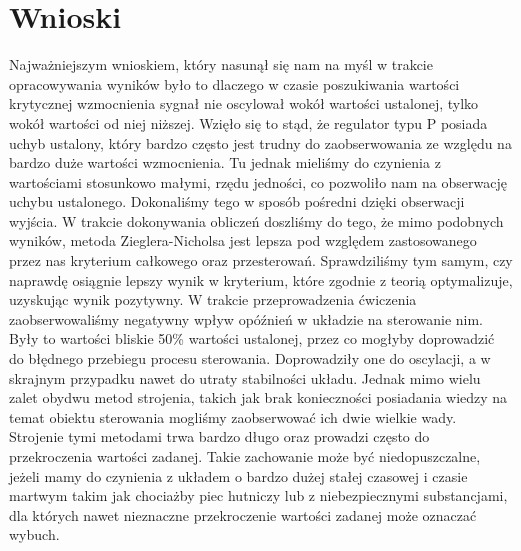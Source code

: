 \documentclass[a4paper, 12pt]{article}
\begin{document}
		\section{Wnioski}
			Najważniejszym wnioskiem, który nasunął się nam na myśl w trakcie opracowywania wyników było to dlaczego w czasie poszukiwania wartości krytycznej wzmocnienia sygnał nie oscylował wokół wartości ustalonej, tylko wokół wartości od niej niższej. Wzięło się to stąd, że regulator typu P posiada uchyb ustalony, który bardzo często jest trudny do zaobserwowania ze względu na bardzo duże wartości wzmocnienia. Tu jednak mieliśmy do czynienia z wartościami stosunkowo małymi, rzędu jedności, co pozwoliło nam na obserwację uchybu ustalonego. Dokonaliśmy tego w sposób pośredni dzięki obserwacji wyjścia.
			\newline
			\newline
			W trakcie dokonywania obliczeń doszliśmy do tego, że mimo podobnych wyników, metoda Zieglera-Nicholsa jest lepsza pod względem zastosowanego przez nas kryterium całkowego oraz przesterowań. Sprawdziliśmy tym samym, czy naprawdę osiągnie lepszy wynik w kryterium, które zgodnie z teorią optymalizuje, uzyskując wynik pozytywny. 
			\newline
			\newline
			W trakcie przeprowadzenia ćwiczenia zaobserwowaliśmy negatywny wpływ opóźnień w układzie na sterowanie nim. Były to wartości bliskie 50\% wartości ustalonej, przez co mogłyby doprowadzić do błędnego przebiegu procesu sterowania. Doprowadziły one do oscylacji, a w skrajnym przypadku nawet do utraty stabilności układu.
			\newline 
			\newline
			Jednak mimo wielu zalet obydwu metod strojenia, takich jak brak konieczności posiadania wiedzy na temat obiektu sterowania mogliśmy zaobserwować ich dwie wielkie wady. Strojenie tymi metodami trwa bardzo długo oraz prowadzi często do przekroczenia wartości zadanej. Takie zachowanie może być niedopuszczalne, jeżeli mamy do czynienia z układem o bardzo dużej stałej czasowej i czasie martwym takim jak chociażby piec hutniczy lub z niebezpiecznymi substancjami, dla których nawet nieznaczne przekroczenie wartości zadanej może oznaczać wybuch.
			\newline
			\newline
			
\end{document}
